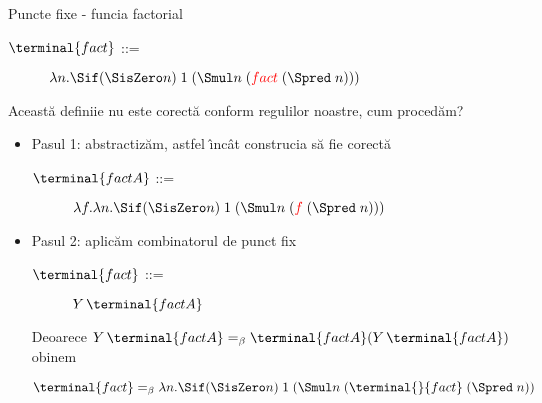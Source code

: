 \documentclass[xcolor=pdftex,romanian,colorlinks]{beamer}
\begin{document}
\begin{frame}[fragile]{Puncte fixe - func\ts ia factorial}

  \begin{description}
    \item[$\terminal{fact}$ ::=] $\lambda n. \Sif (\SisZero n)\; 1\; (\Smul n\; ({\textcolor{red}{fact}}\; (\Spred \;n)))$
    \end{description}
    \pause\medskip
Aceast\u a defini\ts ie nu este corect\u a conform regulilor noastre, cum proced\u am?\pause\medskip
\begin{itemize}
\item Pasul 1: abstractiz\u am, astfel \^{\i}nc\^ at construc\ts ia s\u a fie corect\u a

\begin{description}
    \item[$\terminal{factA}$ ::=] $\lambda f.\lambda n. \Sif (\SisZero n)\; 1\; (\Smul n\; ({\textcolor{red}{f}}\; (\Spred \;n)))$
    \end{description}
\pause
\item Pasul 2: aplic\u am combinatorul de punct fix

\begin{description}
    \item[$\terminal{fact}$ ::=] $ Y \, \terminal{factA}$
    \end{description}
    \pause
    
Deoarece $Y\,\terminal{factA} =_\beta \terminal{factA}(Y\,\terminal{factA})$ ob\ts inem 

   $$\terminal{fact} =_\beta \lambda n. \Sif (\SisZero n)\; 1\; (\Smul n\; ({\terminal{}{fact}}\; (\Spred \;n))$$ 
\end{itemize}    
\end{frame}
\end{document}
